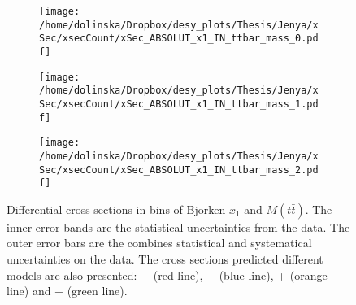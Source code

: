 \begin{figure}[p]
\centering
\begin{subfigure}
  \centering
  \texttt{[image: /home/dolinska/Dropbox/desy\_plots/Thesis/Jenya/xSec/xsecCount/xSec\_ABSOLUT\_x1\_IN\_ttbar\_mass\_0.pdf]}
\end{subfigure}
\begin{subfigure}
  \centering
  \texttt{[image: /home/dolinska/Dropbox/desy\_plots/Thesis/Jenya/xSec/xsecCount/xSec\_ABSOLUT\_x1\_IN\_ttbar\_mass\_1.pdf]}
\end{subfigure}
\begin{subfigure}
  \centering
  \texttt{[image: /home/dolinska/Dropbox/desy\_plots/Thesis/Jenya/xSec/xsecCount/xSec\_ABSOLUT\_x1\_IN\_ttbar\_mass\_2.pdf]}
\end{subfigure}
\caption{Differential cross sections in bins of Bjorken $x_{1}$ and $M(t\bar{t})$. The inner error bands are the statistical uncertainties from the data.
         The outer error bars are the combines statistical and systematical uncertainties on the data. The cross sections predicted different models are also presented:
         \MG + \PYTHIA (red line), \Powheg + \PYTHIA (blue line), \Powheg + \HERWIG (orange line) and \MCNLO + \HERWIG (green line).}
\label{fig:XSU_2D_x1_Mtt}
\end{figure}
